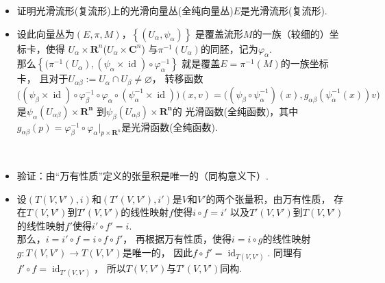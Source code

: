 \begin{itemize}
    ~\\
    \item[3.]
    证明光滑流形(复流形)上的光滑向量丛(全纯向量丛)$E$是光滑流形(复流形).

    \item[\textit{Pf:}]
    设此向量丛为$(E,\pi,M)$，$\left\{(U_\alpha,\psi_\alpha)\right\}$
    是覆盖流形$M$的一族（较细的）坐标卡，使得
    $U_\alpha\times\mathbf{R}^n$($U_\alpha\times\mathbf{C}^n$)
    与$\pi^{-1}(U_\alpha)$的同胚，记为$\varphi_\alpha$.\\
    那么$\left\{(\pi^{-1}(U_\alpha),
    (\psi_\alpha\times\operatorname{id})\circ\varphi_\alpha^{-1}\right\}$
    就是覆盖$E=\pi^{-1}(M)$的一族坐标卡，
    且对于$U_{\alpha\beta}:=U_\alpha\cap U_\beta\ne\varnothing$，
    转移函数$\big((\psi_\beta\times\operatorname{id})\circ\varphi_\beta^{-1}
    \circ\varphi_\alpha\circ(\psi_\alpha^{-1}\times\operatorname{id})\big)(x,v)
    =((\psi_\beta\circ\psi_\alpha^{-1})(x),g_{\alpha\beta}(\psi_\alpha^{-1}(x))v\big)$
    是$\psi_\alpha(U_{\alpha\beta})\times\mathbf{R^n}$
    到$\psi_\beta(U_{\alpha\beta})\times\mathbf{R^n}$的
    光滑函数(全纯函数)，其中$g_{\alpha\beta}(p)=\varphi_\beta^{-1}
    \circ\varphi_\alpha\big|_{p\times\mathbf{R}^n}$是光滑函数(全纯函数).
    
    ~\\
    \item[4.]
    验证：由“万有性质”定义的张量积是唯一的（同构意义下）.
    
    \item[\textit{Pf:}]
    设$(T(V,V'),i)$和$(T'(V,V'),i')$是$V$和$V'$的两个张量积，由万有性质，
    存在$T(V,V')$到$T'(V,V')$的线性映射$f$使得$i\circ f=i'$
    以及$T'(V,V')$到$T(V,V')$的线性映射$f'$使得$i'\circ f'=i$.\\
    那么，$i=i'\circ f=i\circ f\circ f'$，
    再根据万有性质，使得$i=i\circ g$的线性映射$g\colon T(V,V')\rightarrow T(V,V')$是唯一的，
    因此$f\circ f'=\operatorname{id}_{T(V,V')}$.
    同理有$f'\circ f=\operatorname{id}_{T'(V,V')}$，
    所以$T(V,V')$与$T'(V,V')$同构.


\end{itemize}
